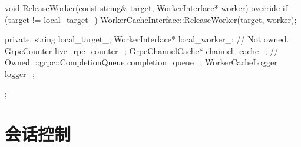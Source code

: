 \begin{content}
\begin{leftbar}
\begin{c++}
{  void ReleaseWorker(const string& target, 
      WorkerInterface* worker) override {
    if (target != local_target_) {
      WorkerCacheInterface::ReleaseWorker(target, worker);
    }
  }

 private:
  string local_target_;
  WorkerInterface* local_worker_;  // Not owned.
  GrpcCounter live_rpc_counter_;
  GrpcChannelCache* channel_cache_;  // Owned.
  ::grpc::CompletionQueue completion_queue_;
  WorkerCacheLogger logger_;
};
\end{c++}
\end{leftbar}

\end{content}

\section{会话控制}

